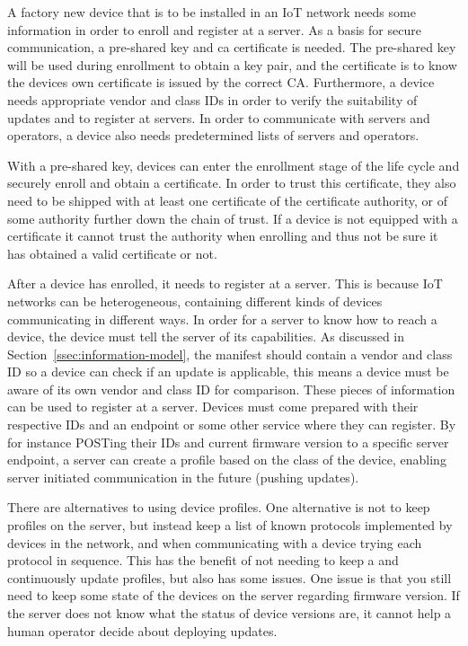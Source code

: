 \documentclass[0-thesis.tex]{subfiles}
\begin{document}
A factory new device that is to be installed in an IoT network needs some information in
order to enroll and register at a server. As a basis for secure communication, a
pre-shared key and \gls{ca} certificate is needed. The pre-shared key will be used during
enrollment to obtain a key pair, and the certificate is to know the devices own
certificate is issued by the correct CA. Furthermore, a device needs appropriate vendor
and class IDs in order to verify the suitability of updates and to register at servers. In
order to communicate with servers and operators, a device also needs predetermined lists
of servers and operators. 

With a pre-shared key, devices can enter the enrollment stage of the life cycle and
securely enroll and obtain a certificate. In order to trust this certificate, they also
need to be shipped with at least one certificate of the certificate authority, or of some
authority further down the chain of trust. If a device is not equipped with a certificate
it cannot trust the authority when enrolling and thus not be sure it has obtained a valid
certificate or not.

After a device has enrolled, it needs to register at a server. This is because IoT
networks can be heterogeneous, containing different kinds of devices communicating in
different ways. In order for a server to know how to reach a device, the device must tell
the server of its capabilities. As discussed in Section~\ref{ssec:information-model}, the
manifest should contain a vendor and class ID so a device can check if an update is
applicable, this means a device must be aware of its own vendor and class ID for
comparison. These pieces of information can be used to register at a server. Devices must
come prepared with their respective IDs and an endpoint or some other service where they
can register. By for instance POSTing their IDs and current firmware version to a specific
server endpoint, a server can create a profile based on the class of the device, enabling
server initiated communication in the future (pushing updates).

There are alternatives to using device profiles. One alternative is not to keep profiles
on the server, but instead keep a list of known protocols implemented by devices in the
network, and when communicating with a device trying each protocol in sequence. This has
the benefit of not needing to keep a and continuously update profiles, but also has some
issues. One issue is that you still need to keep some state of the devices on the server
regarding firmware version. If the server does not know what the status of device versions
are, it cannot help a human operator decide about deploying updates. 
\end{document}

